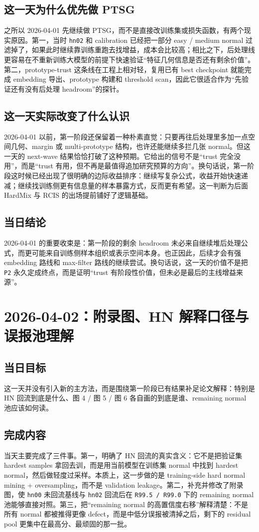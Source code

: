 \documentclass[UTF8,12pt]{ctexart}
\newcommand{\reportdate}[1]{\section{#1}}
\begin{document}
\subsection{这一天为什么优先做 PTSG}
之所以 2026-04-01 先继续做 PTSG，而不是直接改训练集或损失函数，有两个现实原因。第一，当时 \texttt{hn02} 和 calibration 已经把一部分 easy / medium normal 过滤掉了，如果此时继续靠训练重跑去找增益，成本会比较高；相比之下，后处理线更容易在不重新训练大模型的前提下快速验证“特征几何信息是否还有剩余价值”。第二，prototype-trust 这条线在工程上相对轻，复用已有 best checkpoint 就能完成 embedding 导出、prototype 构建和 threshold scan，因此它很适合作为“先验证还有没有后处理 headroom”的探针。

\subsection{这一天实际改变了什么认识}
2026-04-01 以前，第一阶段还保留着一种朴素直觉：只要再往后处理里多加一点空间几何、margin 或 multi-prototype 结构，也许还能继续多拦几张 normal。但这一天的 next-wave 结果恰恰打破了这种预期。它给出的信号不是“trust 完全没用”，而是“trust 有用，但不再是最值得追加研究预算的方向”。换句话说，第一阶段这时候已经出现了很明确的边际收益排序：继续写复杂公式，收益开始快速递减；继续找训练侧更有信息量的样本暴露方式，反而更有希望。这一判断为后面 HardMix 与 RCIS 的出场提前铺好了逻辑基础。

\subsection{当日结论}
2026-04-01 的重要收束是：第一阶段的剩余 headroom 未必来自继续堆后处理公式，而更可能来自训练侧样本组织或表示空间本身。也正因此，后续才会有强 embedding 路线和 max-filter 路线的继续尝试。换句话说，这一天的价值不是把 \texttt{P2} 永久定成终点，而是证明“trust 有阶段性价值，但未必是最后的主线增益来源”。

\reportdate{2026-04-02：附录图、HN 解释口径与误报池理解}

\subsection{当日目标}
这一天并没有引入新的主方法，而是围绕第一阶段已有结果补足论文解释：特别是 HN 回流到底是什么、图 4 / 图 5 / 图 6 各自画的到底是谁、remaining normal 池应该如何读。

\subsection{完成内容}
当天主要完成了三件事。第一，明确了 HN 回流的真实含义：它不是把验证集 hardest samples 拿回去训，而是用当前模型在训练集 normal 中找到 hardest normal，然后做轻度过采样。本质上，这一步做的是 training-side hard normal mining + oversampling，而不是 validation leakage。第二，补充并修改了附录图，使 \texttt{hn00} 未回流基线与 \texttt{hn02} 回流后在 \texttt{R99.5 / R99.0} 下的 remaining normal 池能够直接对照。第三，把“remaining normal 的高置信度右移”解释清楚：不是所有 normal 都被推得更像 defect，而是中低分误报被清掉之后，剩下的 residual pool 更集中在最高分、最顽固的那一批。
\end{document}
